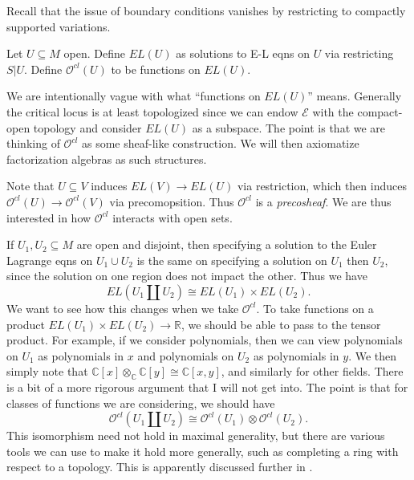 
Recall that the issue of boundary conditions vanishes by restricting to compactly supported variations.

\begin{definition}\label{1.0.2}
	Let $U\subseteq M$ open. Define $EL(U)$ as solutions to E-L eqns on $U$ via restricting $S|U$. Define $\mathcal{O} ^{cl} (U)$ to be functions on $EL(U)$.
\end{definition}
We are intentionally vague with what ``functions on $EL(U)$'' means. Generally the critical locus is at least topologized since we can endow $\mathcal{E} $ with the compact-open topology and consider $EL(U)$ as a subspace. The point is that we are thinking of $\mathcal{O} ^{cl} $ as some sheaf-like construction. We will then axiomatize factorization algebras as such structures.

Note that $U\subseteq V$ induces $EL(V)\to EL(U)$ via restriction, which then induces $\mathcal{O}^{cl}  (U)\to \mathcal{O} ^{cl} (V)$ via precomopsition. Thus $\mathcal{O} ^{cl} $ is a \emph{precosheaf}. We are thus interested in how $\mathcal{O} ^{cl} $ interacts with open sets.

If $U_1,U_2\subseteq M$ are open and disjoint, then specifying a solution to the Euler Lagrange eqns on $U_1 \cup U_2$ is the same on specifying a solution on $U_1$ then $U_2$, since the solution on one region does not impact the other. Thus we have
\[
	EL(U_1 \amalg U_2) \cong EL(U_1)\times EL(U_2)
.\]
We want to see how this changes when we take $\mathcal{O} ^{cl} $. To take functions on a product $EL(U_1)\times EL(U_2)\to \mathbb{R} $, we should be able to pass to the tensor product. For example, if we consider polynomials, then we can view polynomials on $U_1$ as polynomials in $x$ and polynomials on $U_2$ as polynomials in $y$. We then simply note that $\mathbb{C} [x]\otimes _\mathbb{C} \mathbb{C} [y]\cong \mathbb{C} [x,y]$, and similarly for other fields. There is a bit of a more rigorous argument that I will not get into. The point is that for classes of functions we are considering, we should have
\[
	\mathcal{O} ^{cl} (U_1\amalg U_2)\cong \mathcal{O} ^{cl} (U_1)\otimes \mathcal{O} ^{cl} (U_2)
.\]
This isomorphism need not hold in maximal generality, but there are various tools we can use to make it hold more generally, such as completing a ring with respect to a topology. This is apparently discussed further in \cite{cg1}.

